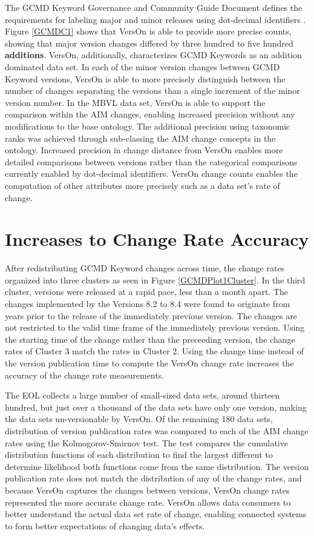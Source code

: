 The GCMD Keyword Governance and Community Guide Document defines the requirements for labeling major and minor releases using dot-decimal identifiers \cite{gcmd_gov}.
Figure \ref{GCMDC1} shows that VersOn is able to provide more precise counts, showing that major version changes differed by three hundred to five hundred \textbf{additions}.
VersOn, additionally, characterizes GCMD Keywords as an addition dominated data set.
In each of the minor version changes between GCMD Keyword versions, VersOn is able to more precisely distinguish between the number of changes separating the versions than a single increment of the minor version number.
In the MBVL data set, VersOn is able to support the comparison within the \gls{AIM} changes, enabling increased precision without any modifications to the base ontology.
The additional precision using taxonomic ranks was achieved through sub-classing the \gls{AIM} change concepts in the ontology.
Increased precision in change distance from VersOn enables more detailed comparisons between versions rather than the categorical comparisons currently enabled by dot-decimal identifiers.
VersOn change counts enables the computation of other attributes more precisely such as a data set's rate of change.

\section{Increases to Change Rate Accuracy}

After redistributing GCMD Keyword changes across time, the change rates organized into three clusters as seen in Figure \ref{GCMDPlot1Cluster}.
In the third cluster, versions were released at a rapid pace, less than a month apart.
The changes implemented by the Versions 8.2 to 8.4 were found to originate from years prior to the release of the immediately previous version.
The changes are not restricted to the valid time frame of the immediately previous version.
Using the starting time of the change rather than the preceeding version, the change rates of Cluster 3 match the rates in Cluster 2.
Using the change time instead of the version publication time to compute the VersOn change rate increases the accuracy of the change rate measurements.

The EOL collects a large number of small-sized data sets, around thirteen hundred, but just over a thousand of the data sets have only one version, making the data sets un-versionable by VersOn.
Of the remaining 180 data sets, distribution of version publication rates was compared to each of the \gls{AIM} change rates using the Kolmogorov-Smirnov test.
The test compares the cumulative distribution functions of each distribution to find the largest different to determine likelihood both functions come from the same distribution.
The version publication rate does not match the distribution of any of the change rates, and because VersOn captures the changes between versions, VersOn change rates represented the more accurate change rate.
VersOn allows data consumers to better understand the actual data set rate of change, enabling connected systems to form better expectations of changing data's effects.

